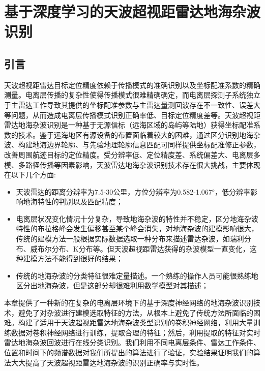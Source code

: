 \chapter{基于深度学习的天波超视距雷达地海杂波识别}
\section{引言}


天波超视距雷达目标定位精度依赖于传播模式的准确识别以及坐标配准系数的精确测量。电离层传播的复杂性使得传播模式很难精确确定，而电离层探测子系统独立于主雷达工作导致其提供的坐标配准参数与主雷达量测回波存在不一致性、误差大等问题，从而造成电离层传播模式识别正确率低、目标定位精度差等。天波超视距雷达地海杂波识别是一种基于无源信标（远海区域的岛屿等陆地）获得坐标配准系数的技术。鉴于远海地区有源设备的布置面临着较大的困难，通过区分识别地海杂波、构建地海边界轮廓、与先验地理轮廓信息匹配可同样提供坐标配准修正参数，改善周围航迹目标的定位精度。受分辨率低、定位精度差、系统偏差大、电离层多模、多路径传播等因素影响，天波雷达地海杂波识别技术存在很大挑战，主要体现在以下几个方面:
\begin{itemize}
	\item 天波雷达的距离分辨率为7.5-30公里，方位分辨率为0.582-1.067°，低分辨率影响地海特性的判别以及匹配精度；
	\item 电离层状况变化情况十分复杂，导致地海杂波的特性并不稳定，区分地海杂波特性的布拉格峰会发生偏移甚至某个峰会消失，对地海杂波的建模影响很大，传统的建模方法一般根据实际数据选取一种分布来描述雷达杂波，如瑞利分布、威布尔分布、K分布等。但天波超视距雷达获得的杂波模型一直变化，这种建模方法不能得到很好的结果；
	\item 传统的地海杂波的分类特征很难定量描述。一个熟练的操作人员可能很熟练地区分出地海杂波，但是这部分却很难利用数学模型对其描述；
\end{itemize}

本章提供了一种新的在复杂的电离层环境下的基于深度神经网络的地海杂波识别技术，避免了对杂波进行建模选取特征的方法，从根本上避免了传统方法所面临的困难。构建了适用于天波超视距雷达地海杂波类型识别的卷积神经网络，利用大量训练数据对卷积神经网络进行训练，提取合理的特征；然后，利用提取的特征对实时雷达地海杂波回波进行在线分类识别。我们利用不同电离层条件、雷达工作条件、位置和时间下的频谱数据对我们所提出的算法进行了验证，实验结果证明我们的算法大大提高了天波超视距雷达地海杂波的识别正确率与实时性。

